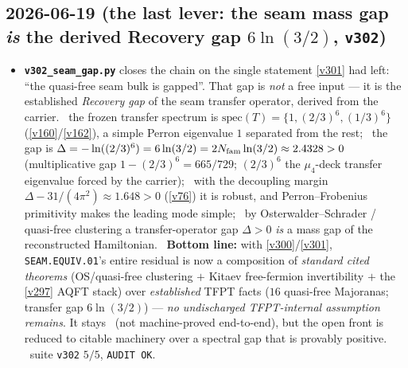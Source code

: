 \subsection*{2026-06-19 (the last lever: the seam mass gap \emph{is} the derived Recovery gap $6\ln(3/2)$, \texttt{v302})}
\begin{itemize}
\item \textbf{\texttt{v302\_seam\_gap.py}} closes the chain on the single statement \vref{v301} had left:
  ``the quasi-free seam bulk is gapped''.  That gap is \emph{not} a free input --- it is the established
  \emph{Recovery gap} of the seam transfer operator, derived from the carrier.  \mE\ the frozen transfer
  spectrum is $\mathrm{spec}(T)=\{1,(2/3)^6,(1/3)^6\}$ (\vref{v160}/\vref{v162}), a simple Perron eigenvalue
  $1$ separated from the rest; \mE\ the gap is $\Delta=-\ln((2/3)^6)=6\ln(3/2)=2N_{\mathrm{fam}}\ln(3/2)\approx2.4328>0$
  (multiplicative gap $1-(2/3)^6=665/729$; $(2/3)^6$ the $\mu_4$-deck transfer eigenvalue forced by the
  carrier); \mE\ with the decoupling margin $\Delta-31/(4\pi^2)\approx1.648>0$ (\vref{v76}) it is robust, and
  Perron--Frobenius primitivity makes the leading mode simple; \mC\ by Osterwalder--Schrader / quasi-free
  clustering a transfer-operator gap $\Delta>0$ \emph{is} a mass gap of the reconstructed Hamiltonian.
  \mO\ \textbf{Bottom line:} with \vref{v300}/\vref{v301}, \texttt{SEAM.EQUIV.01}'s entire residual is now a
  composition of \emph{standard cited theorems} (OS/quasi-free clustering $+$ Kitaev free-fermion invertibility
  $+$ the \vref{v297} AQFT stack) over \emph{established} TFPT facts ($16$ quasi-free Majoranas; transfer gap
  $6\ln(3/2)$) --- \emph{no undischarged TFPT-internal assumption remains}.  It stays \mO\ (not machine-proved
  end-to-end), but the open front is reduced to citable machinery over a spectral gap that is provably positive.
  \mE\ suite \texttt{v302} $5/5$, \texttt{AUDIT OK}.
\end{itemize}

